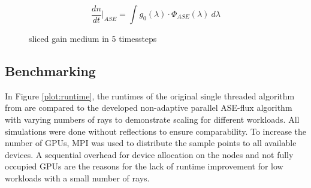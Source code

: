 \begin{equation}
  \label{eq:dndt}
  \frac{dn}{dt}\bigg|_{ASE} = \int g_0(\lambda) \cdot \Phi_{ASE}(\lambda)~d\lambda
\end{equation}
\begin{figure}[H]
  \centerline{
    }
  \caption{sliced gain medium in 5 timessteps}
  \label{graphic:benchmark_4_timeslices}
\end{figure}

\subsection{Benchmarking}
\label{subsec:benchmarking}
In Figure \ref{plot:runtime}, the runtimes of the original single threaded
algorithm from \cite{ASE2010} are compared to the developed non-adaptive
parallel ASE-flux algorithm with varying numbers of rays to demonstrate
scaling for different workloads. All simulations were done without
reflections to ensure comparability. To increase the number of GPUs, MPI\cite{MPI} was used to distribute the
sample points to all available devices. A sequential overhead for device
allocation 
on the nodes and not fully occupied GPUs are the reasons for the lack of runtime
improvement for low workloads with a small number of rays.

